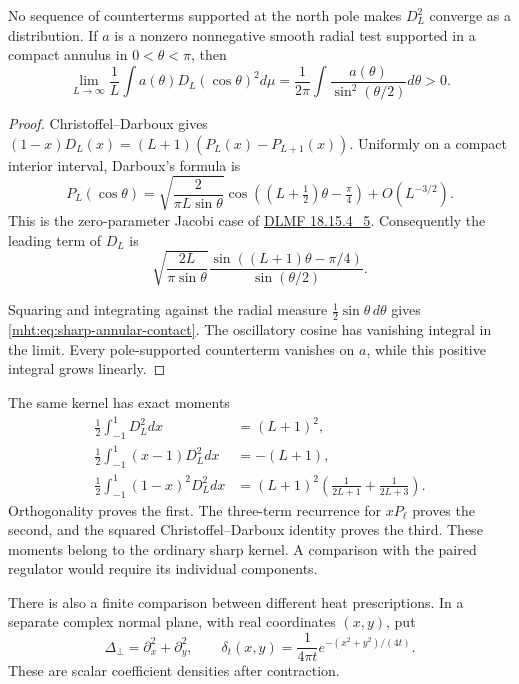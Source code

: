 \begin{proposition}\label{mht:prop:sharp-contact-obstruction}
No sequence of counterterms supported at the north pole makes
$D_L^2$ converge as a distribution. If $a$ is a nonzero
nonnegative smooth radial test supported in a compact annulus
in $0<\theta<\pi$, then
\begin{equation}\label{mht:eq:sharp-annular-contact}
 \lim_{L\to\infty}\frac1L\int a(\theta)D_L(\cos\theta)^2d\mu
   =\frac1{2\pi}\int\frac{a(\theta)}{\sin^2(\theta/2)}d\theta>0.
\end{equation}
\end{proposition}

\begin{proof}
Christoffel--Darboux gives
$(1-x)D_L(x)=(L+1)(P_L(x)-P_{L+1}(x))$.
Uniformly on a compact interior interval, Darboux's formula is
\[
 P_L(\cos\theta)=\sqrt{\frac2{\pi L\sin\theta}}
   \cos((L+\tfrac12)\theta-\tfrac\pi4)+O(L^{-3/2}).
\]
This is the zero-parameter Jacobi case of
\href{https://dlmf.nist.gov/18.15.E4_5}{DLMF 18.15.4\_5}.
Consequently the leading term of $D_L$ is
\[
 \sqrt{\frac{2L}{\pi\sin\theta}}
       \frac{\sin((L+1)\theta-\pi/4)}{\sin(\theta/2)}.
\]

Squaring and integrating against the radial measure
$\frac12\sin\theta\,d\theta$ gives
\eqref{mht:eq:sharp-annular-contact}. The oscillatory cosine
has vanishing integral in the limit. Every pole-supported
counterterm vanishes on $a$, while this positive integral
grows linearly.
\end{proof}

The same kernel has exact moments
\begin{align*}
 \tfrac12\int_{-1}^{1}D_L^2dx&=(L+1)^2,\\
 \tfrac12\int_{-1}^{1}(x-1)D_L^2dx&=-(L+1),\\
 \tfrac12\int_{-1}^{1}(1-x)^2D_L^2dx
   &=(L+1)^2\left(\frac1{2L+1}+\frac1{2L+3}\right).
\end{align*}
Orthogonality proves the first. The three-term recurrence for
$xP_\ell$ proves the second, and the squared
Christoffel--Darboux identity proves the third. These moments belong to the ordinary sharp kernel. A comparison
with the paired regulator would require its individual components.

There is also a finite comparison between different heat
prescriptions. In a separate complex normal plane, with real
coordinates $(x,y)$, put
\[
 \Delta_\perp=\partial_x^2+\partial_y^2,
 \qquad \delta_t(x,y)=\frac1{4\pi t}e^{-(x^2+y^2)/(4t)}.
\]
These are scalar coefficient densities after contraction.


